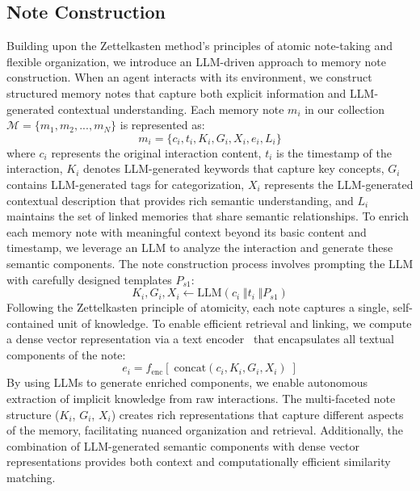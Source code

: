 \documentclass{article}
\begin{document}
\subsection{Note Construction}
Building upon the Zettelkasten method's principles of atomic note-taking and flexible organization, we introduce an LLM-driven approach to memory note construction. When an agent interacts with its environment, we construct structured memory notes that capture both explicit information and LLM-generated contextual understanding. Each memory note $m_i$ in our collection $\mathcal{M} = \{m_1, m_2, ..., m_N\}$ is represented as:
\begin{equation}
m_i = \{c_i, t_i, K_i, G_i, X_i, e_i, L_i\}
\end{equation}
where $c_i$ represents the original interaction content, $t_i$ is the timestamp of the interaction, $K_i$ denotes LLM-generated keywords that capture key concepts, $G_i$ contains LLM-generated tags for categorization, $X_i$ represents the LLM-generated contextual description that provides rich semantic understanding, and $L_i$ maintains the set of linked memories that share semantic relationships.
To enrich each memory note with meaningful context beyond its basic content and timestamp, we leverage an LLM to analyze the interaction and generate these semantic components. The note construction process involves prompting the LLM with carefully designed templates $P_{s1}$:
\begin{equation}
K_i,G_i,X_i \leftarrow   \text{LLM} (c_i \; \Vert t_i \; \Vert P_{s1})
\end{equation}
Following the Zettelkasten principle of atomicity, each note captures a single, self-contained unit of knowledge. To enable efficient retrieval and linking, we compute a dense vector representation via a text encoder~\cite{sentence-bert} that encapsulates all textual components of the note:
\begin{equation}
e_i = f_{\text{enc}}[\; \text{concat}(c_i, K_i, G_i, X_i)\;]
\end{equation}
By using LLMs to generate enriched components, we enable autonomous extraction of implicit knowledge from raw interactions. The multi-faceted note structure ($K_i$, $G_i$, $X_i$) creates rich representations that capture different aspects of the memory, facilitating nuanced organization and retrieval. Additionally, the combination of LLM-generated semantic components with dense vector representations provides both context and computationally efficient similarity matching.
\end{document}
